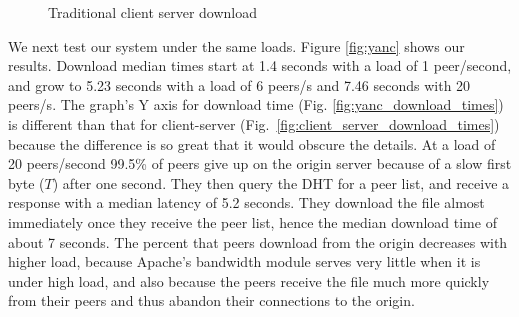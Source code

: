 \begin{figure}
  \begin{center}
    \caption{Traditional client server download}  
  \end{center}
\end{figure}

We next test our system under the same loads. Figure \ref{fig:yanc} shows our results.  Download median times 
start at 1.4 seconds with a load of 1 peer/second, and grow 
to 5.23 seconds with a load of 6 peers/s and 7.46 seconds with 20 peers/s. 
The graph's Y axis for download time (Fig. \ref{fig:yanc_download_times}) 
is different than that for client-server (Fig.~\ref{fig:client_server_download_times}) 
because the difference is so great that it would obscure the details. At a load of 20 peers/second 99.5\% 
of peers give up on the origin server because of a slow first byte ($T$) after one second. They then query the 
DHT for a peer list, and receive a response with a median latency of 5.2 seconds.  They download the file almost 
immediately once they receive the peer list, hence the median download time of about 7 seconds. 
The percent that peers download from the origin decreases with higher load, because Apache's bandwidth module serves 
very little when it is under high load, and also because the peers receive the file much more quickly 
from their peers and thus abandon their connections to the origin.

